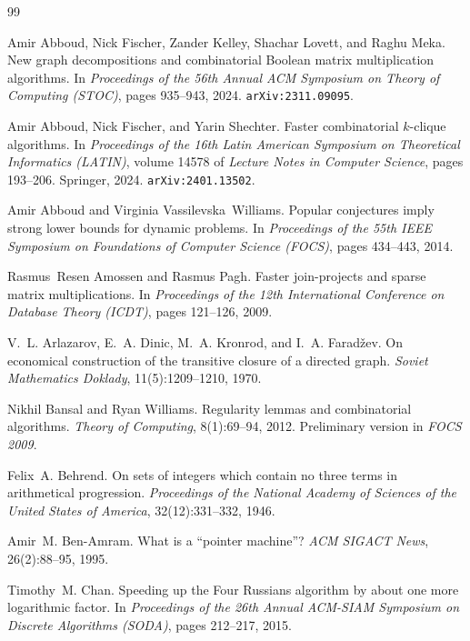 \documentclass[11pt]{article}
\theoremstyle{definition}
\begin{document}
\begin{thebibliography}{99}

Amir Abboud, Nick Fischer, Zander Kelley, Shachar Lovett, and Raghu Meka.
\newblock New graph decompositions and combinatorial Boolean matrix multiplication algorithms.
\newblock In \emph{Proceedings of the 56th Annual ACM Symposium on Theory of Computing (STOC)}, pages 935--943, 2024.
\newblock \texttt{arXiv:2311.09095}.

Amir Abboud, Nick Fischer, and Yarin Shechter.
\newblock Faster combinatorial $k$-clique algorithms.
\newblock In \emph{Proceedings of the 16th Latin American Symposium on Theoretical Informatics (LATIN)}, volume 14578 of \emph{Lecture Notes in Computer Science}, pages 193--206. Springer, 2024.
\newblock \texttt{arXiv:2401.13502}.

Amir Abboud and Virginia Vassilevska~Williams.
\newblock Popular conjectures imply strong lower bounds for dynamic problems.
\newblock In \emph{Proceedings of the 55th IEEE Symposium on Foundations of Computer Science (FOCS)}, pages 434--443, 2014.

Rasmus~Resen Amossen and Rasmus Pagh.
\newblock Faster join-projects and sparse matrix multiplications.
\newblock In \emph{Proceedings of the 12th International Conference on Database Theory (ICDT)}, pages 121--126, 2009.

V.~L. Arlazarov, E.~A. Dinic, M.~A. Kronrod, and I.~A. Farad\v{z}ev.
\newblock On economical construction of the transitive closure of a directed graph.
\newblock \emph{Soviet Mathematics Doklady}, 11(5):1209--1210, 1970.

Nikhil Bansal and Ryan Williams.
\newblock Regularity lemmas and combinatorial algorithms.
\newblock \emph{Theory of Computing}, 8(1):69--94, 2012.
\newblock Preliminary version in \emph{FOCS 2009}.

Felix~A. Behrend.
\newblock On sets of integers which contain no three terms in arithmetical progression.
\newblock \emph{Proceedings of the National Academy of Sciences of the United States of America}, 32(12):331--332, 1946.

Amir~M. Ben-Amram.
\newblock What is a ``pointer machine''?
\newblock \emph{ACM SIGACT News}, 26(2):88--95, 1995.

Timothy~M. Chan.
\newblock Speeding up the Four Russians algorithm by about one more logarithmic factor.
\newblock In \emph{Proceedings of the 26th Annual ACM-SIAM Symposium on Discrete Algorithms (SODA)}, pages 212--217, 2015.


\end{thebibliography}
\end{document}
